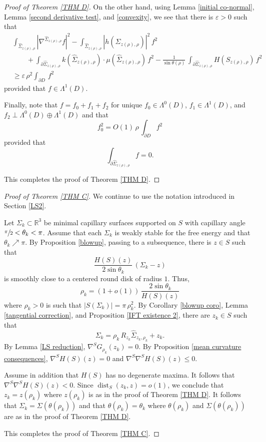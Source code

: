 \documentclass[11pt]{amsart}
\begin{document}
\begin{proof}[Proof of Theorem \ref{THM D}]
	  On the other hand, using Lemma \ref{initial co-normal}, Lemma \ref{second derivative test}, and  \eqref{convexity}, we see that   there is $\varepsilon>0$ such that  
	 \begin{align*}
		&	\int_{\hat \Sigma_{z(\rho),\rho}} |\nabla^{\hat \Sigma_{z(\rho),\rho}} f|^2-\int_{\hat \Sigma_{z(\rho),\rho}} |h(\hat \Sigma_{z(\rho),\rho})|^2\,f^2\\&\qquad +\int_{ \partial \hat \Sigma_{z(\rho),\rho}} k(\hat \Sigma_{z(\rho),\rho})\cdot\mu(\hat \Sigma_{z(\rho),\rho})\,f^2-\frac{1}{\sin\theta(\rho)}\,\int_{ \partial\hat \Sigma_{z(\rho),\rho}} H(S_{z(\rho),\rho})\,f^2
		\\&\geq \varepsilon\,\rho^2 \int_{\partial D}\,f^2 
	\end{align*} 
	provided that $f\in \Lambda^1(D)$. 
	
	Finally, note that  $f=f_0+f_1+f_2$ for unique $f_0\in \Lambda^0(D)$, $f_1\in \Lambda^1(D)$, and $f_2\perp \Lambda^0(D)\oplus \Lambda^1(D)$ and that 
	$$
	f^2_0=O(1)\,\rho\,\int_{\partial D}f^2
	$$
	provided that
		$$
	\int_{\partial \hat \Sigma_{z(\rho),\rho}}f=0.
	$$
	

 This completes the proof of Theorem \ref{THM D}.
\end{proof}
\begin{proof}[Proof of Theorem \ref{THM C}]
		We continue to use the notation introduced in Section \ref{LS2}.
	
	
	Let
$\Sigma_k\subset \mathbb{R}^3$ be  minimal capillary surfaces supported on $S$ with capillary angle $\sfrac{\pi}2<\theta_k<\pi$. Assume that each $\Sigma_k$ is weakly stable for the free energy and that $\theta_k\nearrow \pi$. By Proposition \ref{blowup}, passing to a subsequence, there is $z\in S$ such that 
$$
\frac{H(S)(z)}{2\sin\theta_k}\,(\Sigma_k-z) 
$$
is smoothly close to a centered round disk of radius $1$. Thus, 
$$
\rho_k=(1+o(1))\,\frac{2\sin\theta_k}{H(S)(z)}
$$ where $\rho_k>0$ is such that $|S(\Sigma_k)|=\pi\,\rho_k^2$. 
 By Corollary \ref{blowup coro}, Lemma \ref{tangential correction},  and Proposition \ref{IFT existence 2}, there are $z_k\in S$ such that
$$
\Sigma_k=\rho_k\,R_{z_k}\hat \Sigma_{z_k,\rho_k}+z_k.
$$
By Lemma \ref{LS reduction}, $\nabla^S {G}_{\rho_k}(z_k)=0$. By Proposition \ref{mean curvature consequences}, $\nabla^SH(S)(z)=0$ and $\nabla^S\nabla^S H(S)(z)\leq 0$. 

Assume in addition that $H(S)$ has no degenerate maxima. It follows that $\nabla^S\nabla^S H(S)(z)< 0$. Since $\operatorname{dist}_S(z_k,z)=o(1)$,   we conclude that $z_k=z(\rho_k)$ where $z(\rho_k)$ is as in the proof of Theorem \ref{THM D}. It follows that $\Sigma_k=\Sigma(\theta(\rho_k))$ and that $\theta(\rho_k)=\theta_k$ where $\theta(\rho_k)$ and $\Sigma(\theta(\rho_k))$ are as in the proof of Theorem \ref{THM D}.

This completes the proof of Theorem \ref{THM C}.
\end{proof}
\end{document}

